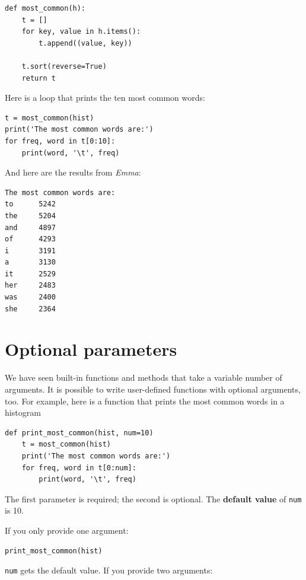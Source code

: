 \documentclass[10pt]{book}
\begin{document}
\beforeverb
\begin{verbatim}
def most_common(h):
    t = []
    for key, value in h.items():
        t.append((value, key))

    t.sort(reverse=True)
    return t
\end{verbatim}
\afterverb
%
Here is a loop that prints the ten most common words:

\beforeverb
\begin{verbatim}
t = most_common(hist)
print('The most common words are:')
for freq, word in t[0:10]:
    print(word, '\t', freq)
\end{verbatim}
\afterverb
%
And here are the results from {\em Emma}:

\beforeverb
\begin{verbatim}
The most common words are:
to      5242
the     5204
and     4897
of      4293
i       3191
a       3130
it      2529
her     2483
was     2400
she     2364
\end{verbatim}
\afterverb
%

\section{Optional parameters}


We have seen built-in functions and methods that take a variable
number of arguments.  It is possible to write user-defined functions
with optional arguments, too.  For example, here is a function that
prints the most common words in a histogram

\beforeverb
\begin{verbatim}
def print_most_common(hist, num=10)
    t = most_common(hist)
    print('The most common words are:')
    for freq, word in t[0:num]:
        print(word, '\t', freq)
\end{verbatim}
\afterverb

The first parameter is required; the second is optional.
The {\bf default value} of {\tt num} is 10.


If you only provide one argument:

\beforeverb
\begin{verbatim}
print_most_common(hist)
\end{verbatim}
\afterverb

{\tt num} gets the default value.  If you provide two arguments:
\end{document}

